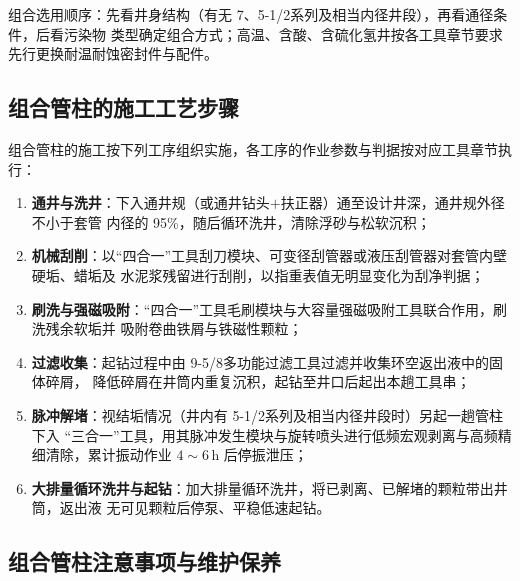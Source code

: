 组合选用顺序：先看井身结构（有无 7\inch、5-1/2\inch 系列及相当内径井段），再看通径条件，后看污染物
类型确定组合方式；高温、含酸、含硫化氢井按各工具章节要求先行更换耐温耐蚀密封件与配件。

\subsection{组合管柱的施工工艺步骤}

组合管柱的施工按下列工序组织实施，各工序的作业参数与判据按对应工具章节执行：

\begin{enumerate}[label=(\arabic*),leftmargin=2em,itemsep=2pt]
	\item \textbf{通井与洗井}：下入通井规（或通井钻头$+$扶正器）通至设计井深，通井规外径不小于套管
	内径的 95\%，随后循环洗井，清除浮砂与松软沉积；
	\item \textbf{机械刮削}：以“四合一”工具刮刀模块、可变径刮管器或液压刮管器对套管内壁硬垢、蜡垢及
	水泥浆残留进行刮削，以指重表值无明显变化为刮净判据；
	\item \textbf{刷洗与强磁吸附}：“四合一”工具毛刷模块与大容量强磁吸附工具联合作用，刷洗残余软垢并
	吸附卷曲铁屑与铁磁性颗粒；
	\item \textbf{过滤收集}：起钻过程中由 9-5/8\inch 多功能过滤工具过滤并收集环空返出液中的固体碎屑，
	降低碎屑在井筒内重复沉积，起钻至井口后起出本趟工具串；
	\item \textbf{脉冲解堵}：视结垢情况（井内有 5-1/2\inch 系列及相当内径井段时）另起一趟管柱下入
	“三合一”工具，用其脉冲发生模块与旋转喷头进行低频宏观剥离与高频精细清除，累计振动作业
	$4\sim6$\,h 后停振泄压；
	\item \textbf{大排量循环洗井与起钻}：加大排量循环洗井，将已剥离、已解堵的颗粒带出井筒，返出液
	无可见颗粒后停泵、平稳低速起钻。
\end{enumerate}

\subsection{组合管柱注意事项与维护保养}

